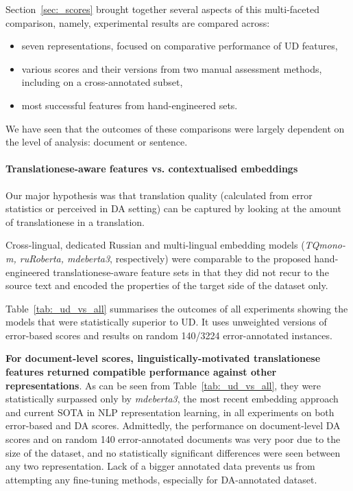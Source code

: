 Section~\ref{sec:_scores} brought together several aspects of this multi-faceted comparison, namely, experimental results are compared across:

\begin{itemize}\compresslist{}
	\item seven representations, focused on comparative performance of UD features,
	\item various scores and their versions from two manual assessment methods, including on a cross-annotated subset,
	\item most successful features from hand-engineered sets.
\end{itemize}

We have seen that the outcomes of these comparisons were largely dependent on the level of analysis: document or sentence.

\paragraph{Translationese-aware features vs. contextualised embeddings}
Our major hypothesis was that translation quality (calculated from error statistics or perceived in DA setting) can be captured by looking at the amount of translationese in a translation. 

Cross-lingual, dedicated Russian and multi-lingual embedding models (\textit{TQmono-m, ruRoberta, mdeberta3}, respectively) were comparable to the proposed hand-engineered translationese-aware feature sets in that they did not recur to the source text and encoded the properties of the target side of the dataset only.

Table~\ref{tab:_ud_vs_all} summarises the outcomes of all experiments showing the models that were statistically superior to UD. It uses unweighted versions of error-based scores and results on random 140/3224 error-annotated instances.

\textbf{For document-level scores, linguistically-motivated translationese features returned compatible performance against other representations}. As can be seen from Table~\ref{tab:_ud_vs_all}, they were statistically surpassed only by \textit{mdeberta3}, the most recent embedding approach and current SOTA in NLP representation learning, in all experiments on both error-based and DA scores. Admittedly, the performance on document-level DA scores and on random 140 error-annotated documents was very poor due to the size of the dataset, and no statistically significant differences were seen between any two representation. 
Lack of a bigger annotated data prevents us from attempting any fine-tuning methods, especially for DA-annotated dataset.

